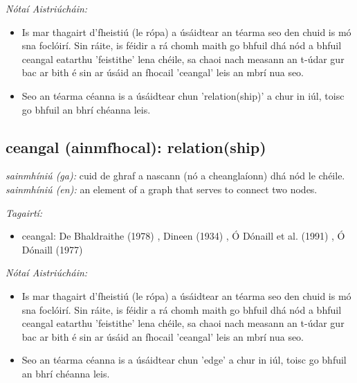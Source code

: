 \documentclass{article}
\begin{document}
 \noindent \textit{Nótaí Aistriúcháin:}
\begin{itemize}
	\item Is mar thagairt d'fheistiú (le rópa) a úsáidtear an téarma seo den chuid is mó sna foclóirí. Sin ráite, is féidir a rá chomh maith go bhfuil dhá nód a bhfuil ceangal eatarthu 'feistithe' lena chéile, sa chaoi nach measann an t-údar gur bac ar bith é sin ar úsáid an fhocail 'ceangal' leis an mbrí nua seo.
	\item Seo an téarma céanna is a úsáidtear chun 'relation(ship)' a chur in iúl, toisc go bhfuil an bhrí chéanna leis.
\end{itemize}


\subsection*{ceangal (ainmfhocal): relation(ship)} 
 \noindent \textit{sainmhíniú (ga):} cuid de ghraf a nascann (nó a cheanglaíonn) dhá nód le chéile.
\newline\newline
 \noindent \textit{sainmhíniú (en):} an element of a graph that serves to connect two nodes.
\newline

 \noindent \textit{Tagairtí:}
\begin{itemize}
	\item ceangal: De Bhaldraithe (1978) \cite{de-bhaldraithe}, Dineen (1934) \cite{dineen}, Ó Dónaill et al. (1991) \cite{focloir-beag}, Ó Dónaill (1977) \cite{odonaill}
\end{itemize}

 \noindent \textit{Nótaí Aistriúcháin:}
\begin{itemize}
	\item Is mar thagairt d'fheistiú (le rópa) a úsáidtear an téarma seo den chuid is mó sna foclóirí. Sin ráite, is féidir a rá chomh maith go bhfuil dhá nód a bhfuil ceangal eatarthu 'feistithe' lena chéile, sa chaoi nach measann an t-údar gur bac ar bith é sin ar úsáid an fhocail 'ceangal' leis an mbrí nua seo.
	\item Seo an téarma céanna is a úsáidtear chun 'edge' a chur in iúl, toisc go bhfuil an bhrí chéanna leis.
\end{itemize}
\end{document}
